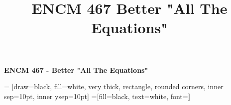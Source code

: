\documentclass[8pt]{extarticle}
\title{ENCM 467 Better "All The Equations" }
\begin{document}
\begin{center}{\huge{\textbf{ENCM 467 - Better "All The Equations"}}}\\
\end{center}
\begin{multicols*}{3}

 = [draw=black, fill=white, very thick,
    rectangle, rounded corners, inner sep=10pt, inner ysep=10pt]
 =[fill=black, text=white, font=\bfseries]

%






























\end{multicols*}
\end{document}
